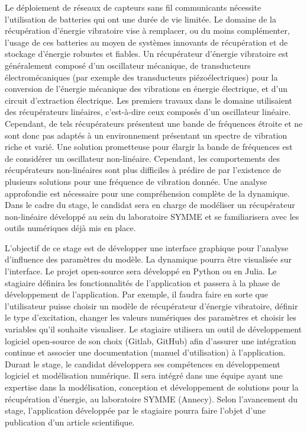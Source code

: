 \documentclass[a4paper, french, 12pt, titlepage]{article}
\begin{document}
Le déploiement de réseaux de capteurs sans fil communicants nécessite l'utilisation de batteries qui ont une durée de vie limitée.
Le domaine de la récupération d'énergie vibratoire vise à remplacer, ou du moins complémenter, l'usage de ces batteries au moyen de systèmes innovants de récupération et de stockage d'énergie robustes et fiables.
Un récupérateur d'énergie vibratoire est généralement composé d'un oscillateur mécanique, de transducteurs électromécaniques (par exemple des transducteurs piézoélectriques) pour la conversion de l'énergie mécanique des vibrations en énergie électrique, et d'un circuit d'extraction électrique.
Les premiers travaux dans le domaine utilisaient des récupérateurs linéaires, c'est-à-dire ceux composés d'un oscillateur linéaire.
Cependant, de tels récupérateurs présentent une bande de fréquences étroite et ne sont donc pas adaptés à un environnement présentant un spectre de vibration riche et varié.
Une solution prometteuse pour élargir la bande de fréquences est de considérer un oscillateur non-linéaire.
Cependant, les comportements des récupérateurs non-linéaires sont plus difficiles à prédire de par l'existence de plusieurs solutions pour une fréquence de vibration donnée.
Une analyse approfondie est nécessaire pour une compréhension complète de la dynamique.
Dans le cadre du stage, le candidat sera en charge de modéliser un récupérateur non-linéaire développé au sein du laboratoire SYMME et se familiarisera avec les outils numériques déjà mis en place.

L'objectif de ce stage est de développer une interface graphique pour l'analyse d'influence des paramètres du modèle.
La dynamique pourra être visualisée sur l'interface.
Le projet open-source sera développé en Python ou en Julia.
Le stagiaire définira les fonctionnalités de l'application et passera à la phase de développement de l'application.
Par exemple, il faudra faire en sorte que l'utilisateur puisse choisir un modèle de récupérateur d'énergie vibratoire, définir le type d'excitation, changer les valeurs numériques des paramètres et choisir les variables qu'il souhaite visualiser.
Le stagiaire utilisera un outil de développement logiciel open-source de son choix (Gitlab, GitHub) afin d'assurer une intégration continue et associer une documentation (manuel d'utilisation) à l'application.
Durant le stage, le candidat développera ses compétences en développement logiciel et modélisation numérique.
Il sera intégré dans une équipe ayant une expertise dans la modélisation, conception et développement de solutions pour la récupération d'énergie, au laboratoire SYMME (Annecy).
Selon l'avancement du stage, l'application développée par le stagiaire pourra faire l'objet d'une publication d'un article scientifique.
\end{document}
